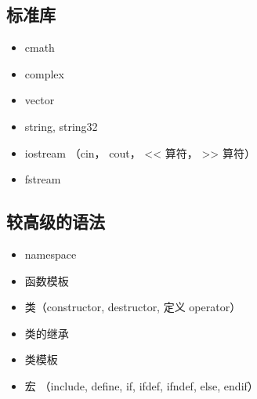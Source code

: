 \subsection{标准库}
\begin{itemize}
\item cmath
\item complex
\item vector
\item string, string32
\item iostream （cin， cout， << 算符， >> 算符）
\item fstream
\end{itemize}

\subsection{较高级的语法}
\begin{itemize}
\item namespace
\item 函数模板
\item 类（constructor, destructor, 定义 operator）
\item 类的继承
\item 类模板
\item 宏 （include, define, if, ifdef, ifndef, else, endif）
\end{itemize}
